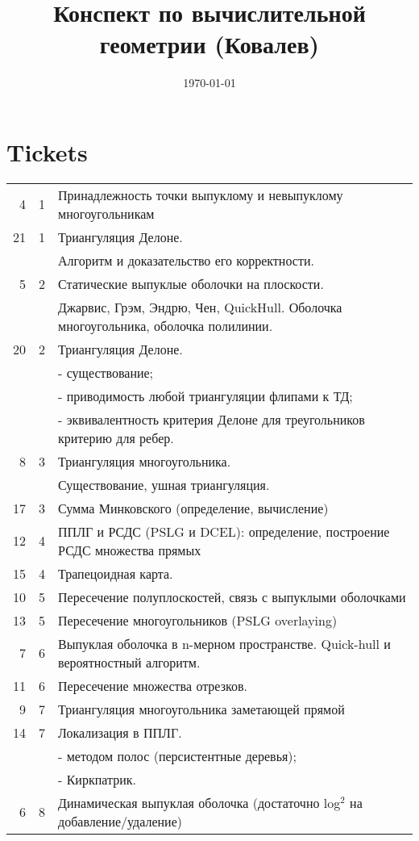 \documentclass[11pt]{article}
\date{\today}
\title{Конспект по вычислительной геометрии (Ковалев)}
\begin{document}
\maketitle
\tableofcontents


\section{Tickets}
\label{sec-1}
\begin{center}
\begin{tabular}{rrl}
4 & 1 & Принадлежность точки выпуклому и невыпуклому многоугольникам\\
21 & 1 & Триангуляция Делоне.\\
 &  & Алгоритм и доказательство его корректности.\\
5 & 2 & Статические выпуклые оболочки на плоскости.\\
 &  & Джарвис, Грэм, Эндрю, Чен, QuickHull. Оболочка многоугольника, оболочка полилинии.\\
20 & 2 & Триангуляция Делоне.\\
 &  & - существование;\\
 &  & - приводимость любой триангуляции флипами к ТД;\\
 &  & - эквивалентность критерия Делоне для треугольников критерию для ребер.\\
8 & 3 & Триангуляция многоугольника.\\
 &  & Существование, ушная триангуляция.\\
17 & 3 & Сумма Минковского (определение, вычисление)\\
12 & 4 & ППЛГ и РСДС (PSLG и DCEL): определение, построение РСДС множества прямых\\
15 & 4 & Трапецоидная карта.\\
10 & 5 & Пересечение полуплоскостей, связь с выпуклыми оболочками\\
13 & 5 & Пересечение многоугольников (PSLG overlaying)\\
7 & 6 & Выпуклая оболочка в n-мерном пространстве. Quick-hull и вероятностный алгоритм.\\
11 & 6 & Пересечение множества отрезков.\\
9 & 7 & Триангуляция многоугольника заметающей прямой\\
14 & 7 & Локализация в ППЛГ.\\
 &  & - методом полос (персистентные деревья);\\
 &  & - Киркпатрик.\\
6 & 8 & Динамическая выпуклая оболочка (достаточно log$^{\text{2}}$ на добавление/удаление)\\

\end{tabular}
\end{center}
\end{document}
